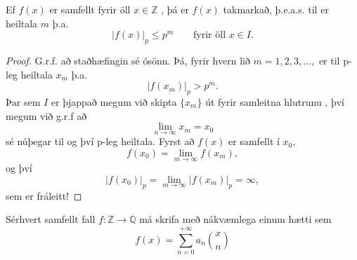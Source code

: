 \begin{setn}
Ef $f(x)$ er samfellt fyrir öll $x\in \mathbb{Z}$ , þá er $f(x)$ takmarkað, þ.e.a.s. til er heiltala $m$ þ.a. 
\begin{equation*}
|f(x) |_p \leq p^m \qquad \mbox{fyrir öll   } x\in I.
\end{equation*}
\end{setn}
\begin{proof}
G.r.f. að staðhæfingin sé ósönn. Þá, fyrir hvern lið $m=1,2,3,\ldots,$ er til p-leg heiltala $x_m$ þ.a.
\begin{equation*}
|f(x_m)|_p > p^m.
\end{equation*}
Þar sem $I$ er þjappað megum við skipta $\{x_m\}$ út fyrir samleitna hlutrunu , því megum við g.r.f að 
\begin{equation*}
\lim_{n \rightarrow \infty} x_m = x_0
\end{equation*}
sé núþegar til og því p-leg heiltala. Fyrst að $f(x)$ er samfellt í $x_0$,
\begin{equation*}
f(x_0) = \lim_{m\rightarrow \infty} f(x_m),
\end{equation*}
og því 
\begin{equation*}
|f(x_0)|_p = \lim_{m \rightarrow \infty} |f(x_m)|_p = \infty,
\end{equation*}
sem er fráleitt!
\end{proof}

\begin{setn}
Sérhvert samfellt fall $f:\mathbb{Z} \rightarrow \mathbb{Q}$ má skrifa með nákvæmlega einum hætti sem
\begin{equation*}
f(x) = \sum_{n=0}^{+\infty} a_n \binom{x}{n}
\end{equation*} 
\end{setn}

\newpage
\nocite{NewEntry1}
\nocite{NewEntry2}
\nocite{NewEntry3}
\nocite{NewEntry4}





